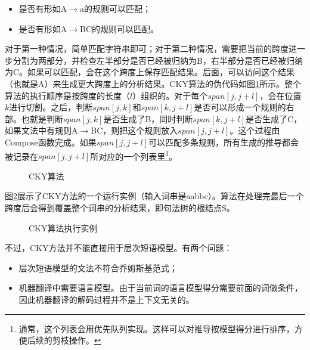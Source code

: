 \begin{itemize}
\vspace{0.5em}
\item 	是否有形如A$\to$a的规则可以匹配；
\vspace{0.5em}
\item 	是否有形如A$\to$BC的规则可以匹配。
\vspace{0.5em}
\end{itemize}

\parinterval 对于第一种情况，简单匹配字符串即可；对于第二种情况，需要把当前的跨度进一步分割为两部分，并检查左半部分是否已经被归纳为B，右半部分是否已经被归纳为C。如果可以匹配，会在这个跨度上保存匹配结果。后面，可以访问这个结果（也就是A）来生成更大跨度上的分析结果。CKY算法的伪代码如图\ref{fig:4-36}所示。整个算法的执行顺序是按跨度的长度（$l$）组织的。对于每个$span[j,j + l]$，会在位置$k$进行切割。之后，判断$span[j,k]$和$span[k,j +l]$是否可以形成一个规则的右部。也就是判断$span[j,k]$是否生成了B，同时判断$span[k,j + l]$是否生成了C，如果文法中有规则A$\to$BC，则把这个规则放入$span[j,j+l]$。这个过程由Compose函数完成。如果$span[j,j + l]$可以匹配多条规则，所有生成的推导都会被记录在$span[j,j + l]$所对应的一个列表里\footnote[6]{通常，这个列表会用优先队列实现。这样可以对推导按模型得分进行排序，方便后续的剪枝操作。}。

\begin{figure}[htp]
\centering

\caption{CKY算法}
\label{fig:4-36}
\end{figure}

\parinterval 图\ref{fig:4-37}展示了CKY方法的一个运行实例（输入词串是aabbc）。算法在处理完最后一个跨度后会得到覆盖整个词串的分析结果，即句法树的根结点S。

\begin{figure}[htp]
\centering


\caption{CKY算法执行实例}
\label{fig:4-37}
\end{figure}

\parinterval 不过，CKY方法并不能直接用于层次短语模型。有两个问题：

\begin{itemize}
\vspace{0.5em}
\item 层次短语模型的文法不符合乔姆斯基范式；
\vspace{0.5em}
\item 机器翻译中需要语言模型。由于当前词的语言模型得分需要前面的词做条件，因此机器翻译的解码过程并不是上下文无关的。
\vspace{0.5em}
\end{itemize}

